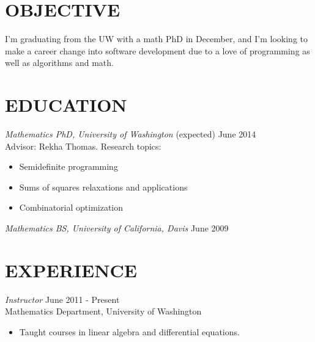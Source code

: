 \documentclass{res}
\begin{document}
 

\address{http://www.math.washington.edu/\textasciitilde jpfeiff/\\jamesrpfeiffer@gmail.com}
\address{522 North 85th St \#C235\\Seattle, WA 98103\\360-616-1403}


                                  
\begin{resume}

\section{OBJECTIVE}          
    I'm graduating from the UW with a math PhD in December, and I'm looking to
    make a career change into software development due to a love of programming as well as algorithms and math.

\section{EDUCATION} {\sl Mathematics PhD, University of Washington} \hfill (expected) June 2014 \\
                Advisor: Rekha Thomas. Research topics:
                 \begin{itemize}  \itemsep -2pt %
                 \item Semidefinite programming
                \item Sums of squares relaxations and applications
                \item Combinatorial optimization
                \end{itemize}
 
                {\sl Mathematics BS, University of California, Davis} \hfill            June 2009 


\section{EXPERIENCE} {\sl Instructor} \hfill June 2011 - Present\\
                Mathematics Department, University of Washington
                 \begin{itemize}  \itemsep -2pt %
                 \item Taught courses in linear algebra and differential equations.
                \end{itemize}
 

\end{resume}
\end{document}
